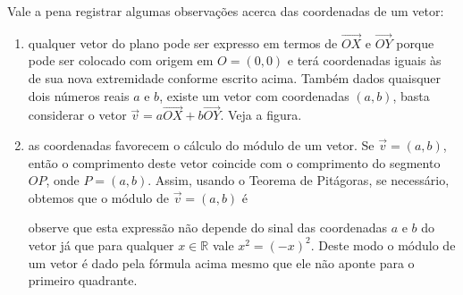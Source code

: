 Vale a pena registrar algumas observações acerca das coordenadas de um vetor:
\begin{enumerate}
\item {} 
qualquer vetor do plano pode ser expresso em termos de \(\overrightarrow{OX}\) e \(\overrightarrow{OY}\) porque pode ser colocado com origem em \(O = (0,0)\) e terá coordenadas iguais às de sua nova extremidade conforme escrito acima. Também dados quaisquer dois números reais \(a\) e \(b\), existe um vetor com coordenadas \((a,b)\), basta considerar o vetor \(\vec{v}=a\overrightarrow{OX} + b\overrightarrow{OY}\). Veja a figura.
\begin{center}\end{center}
\item {} 
as coordenadas favorecem o cálculo do módulo de um vetor. Se \(\vec{v}=(a,b)\), então o comprimento deste vetor coincide com o comprimento do segmento \(OP\), onde \(P=(a,b)\). Assim, usando o Teorema de Pitágoras, se necessário, obtemos que o módulo de \(\vec{v}=(a,b)\) é
\begin{center}\end{center}
observe que esta expressão não depende do sinal das coordenadas \(a\) e \(b\) do vetor já que para qualquer \(x \in \mathbb{R}\) vale \(x^2 = (-x)^2\). Deste modo o módulo de um vetor é dado pela fórmula acima mesmo que ele não aponte para o primeiro quadrante.

\end{enumerate}


